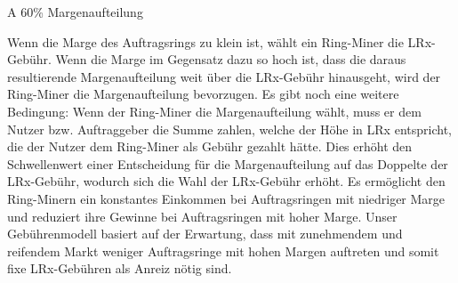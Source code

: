 \documentclass[UTF8,nofonts]{article}
\makeatletter
\newenvironment{figurehere}
 {\def\@captype{figure}}
 {}
\makeatother
\begin{document}
\begin{multicols}{2}
\begin{center}
\begin{figurehere}
\caption{A 60\% Margenaufteilung}
\label{fig:marginsplit}
\end{figurehere}
\end{center}

Wenn die Marge des Auftragsrings zu klein ist, wählt ein Ring-Miner die LRx-Gebühr. Wenn die Marge im Gegensatz dazu so hoch ist, dass die daraus resultierende Margenaufteilung weit über die LRx-Gebühr hinausgeht, wird der Ring-Miner die Margenaufteilung bevorzugen. Es gibt noch eine weitere Bedingung: Wenn der Ring-Miner die Margenaufteilung wählt, muss er dem Nutzer bzw. Auftraggeber die Summe zahlen, welche der Höhe in LRx entspricht, die der Nutzer dem Ring-Miner als Gebühr gezahlt hätte. Dies erhöht den Schwellenwert einer Entscheidung für die Margenaufteilung auf das Doppelte der LRx-Gebühr, wodurch sich die Wahl der LRx-Gebühr erhöht. Es ermöglicht den Ring-Minern ein konstantes Einkommen bei Auftragsringen mit niedriger Marge und reduziert ihre Gewinne bei Auftragsringen mit hoher Marge. Unser Gebührenmodell basiert auf der Erwartung, dass mit zunehmendem und reifendem Markt weniger Auftragsringe mit hohen Margen auftreten und somit fixe LRx-Gebühren als Anreiz nötig sind.


\end{multicols}
\end{document}
